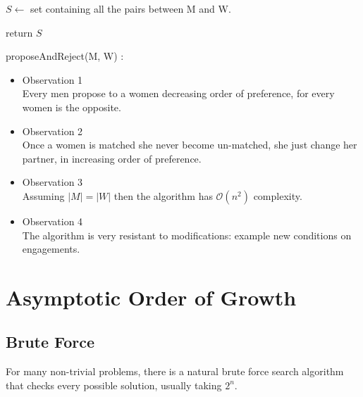 \documentclass[11pt]{article}
\begin{document}
\begin{algorithm}[H]
\SetAlgoLined
\small
{}
\BlankLine

$S \leftarrow$ set containing all the pairs between M and W.

\BlankLine
{}
\BlankLine

return $S$\;
\caption{proposeAndReject(M, W) :}
\end{algorithm} 

\begin{itemize}
\item Observation 1\\
Every men propose to a women decreasing order of preference, for every women is the opposite. 

\item Observation 2\\
Once a women is matched she never become un-matched, she just change her partner, in increasing order of preference.

\item Observation 3\\
Assuming $|M| = |W|$ then the algorithm has $\mathcal{O}(n^{2})$ complexity.

\item Observation 4\\
The algorithm is very resistant to modifications: example new conditions on engagements.
\end{itemize}

\clearpage

\section{Asymptotic Order of Growth}

\subsection{Brute Force}
For many non-trivial problems, there is a natural brute force search algorithm that checks every possible solution, usually taking $2^{n}$.
\end{document}
